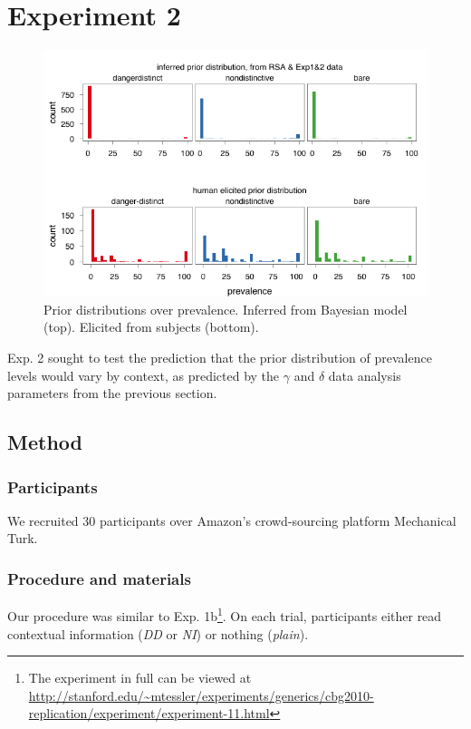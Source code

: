 \documentclass[10pt,letterpaper]{article}
\begin{document}
\section{Experiment 2}

\begin{figure}
\centering
    \includegraphics[width=\columnwidth]{exp3hist_inferredMeanPriorExp1_2}
    \caption{Prior distributions over prevalence. Inferred from Bayesian model (top). Elicited from subjects (bottom).}
  \label{fig:modeldatapriors}
\end{figure}

Exp. 2 sought to test the prediction that the prior distribution of prevalence levels would vary by context, as predicted by the $\gamma$ and $\delta$ data analysis parameters from the previous section.

\subsection{Method}

\subsubsection{Participants}

We recruited 30 participants over Amazon's crowd-sourcing platform Mechanical Turk. 

\subsubsection{Procedure and materials}

Our procedure was similar to Exp. 1b\footnote{The experiment in full can be viewed at \url{http://stanford.edu/~mtessler/experiments/generics/cbg2010-replication/experiment/experiment-11.html}}. On each trial, participants either read contextual information (\emph{DD} or \emph{NI}) or nothing (\emph{plain}). 
\end{document}
